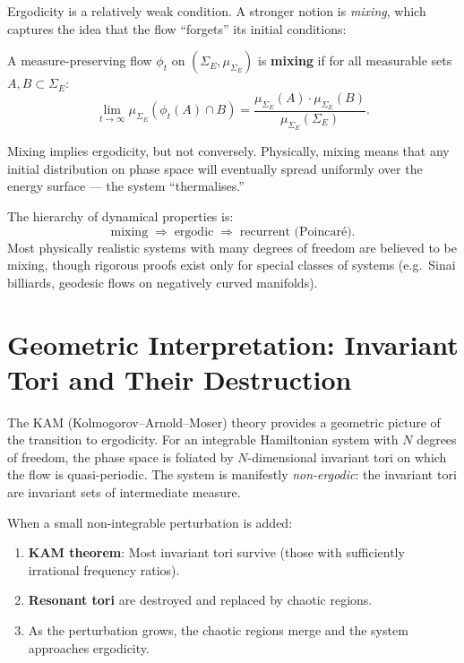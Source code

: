 Ergodicity is a relatively weak condition. A stronger notion is \emph{mixing}, which captures the idea that the flow ``forgets'' its initial conditions:

\begin{definition}
A measure-preserving flow $\phi_t$ on $(\Sigma_E, \mu_{\Sigma_E})$ is \textbf{mixing} if for all measurable sets $A, B \subset \Sigma_E$:
\begin{equation}
\lim_{t \to \infty} \mu_{\Sigma_E}(\phi_t(A) \cap B) = \frac{\mu_{\Sigma_E}(A)\cdot\mu_{\Sigma_E}(B)}{\mu_{\Sigma_E}(\Sigma_E)}.
\end{equation}
\end{definition}

Mixing implies ergodicity, but not conversely. Physically, mixing means that any initial distribution on phase space will eventually spread uniformly over the energy surface --- the system ``thermalises.''

\begin{remark}
The hierarchy of dynamical properties is:
\begin{equation}
\text{mixing} \;\Longrightarrow\; \text{ergodic} \;\Longrightarrow\; \text{recurrent (Poincar\'e)}.
\end{equation}
Most physically realistic systems with many degrees of freedom are believed to be mixing, though rigorous proofs exist only for special classes of systems (e.g.\ Sinai billiards, geodesic flows on negatively curved manifolds).
\end{remark}

\section{Geometric Interpretation: Invariant Tori and Their Destruction}

The KAM (Kolmogorov--Arnold--Moser) theory provides a geometric picture of the transition to ergodicity. For an integrable Hamiltonian system with $N$ degrees of freedom, the phase space is foliated by $N$-dimensional invariant tori on which the flow is quasi-periodic. The system is manifestly \emph{non-ergodic}: the invariant tori are invariant sets of intermediate measure.

When a small non-integrable perturbation is added:
\begin{enumerate}
\item \textbf{KAM theorem}: Most invariant tori survive (those with sufficiently irrational frequency ratios).
\item \textbf{Resonant tori} are destroyed and replaced by chaotic regions.
\item As the perturbation grows, the chaotic regions merge and the system approaches ergodicity.
\end{enumerate}

